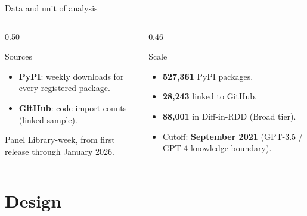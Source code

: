 \documentclass[10pt, aspectratio=169]{beamer}
\begin{document}
\begin{frame}{Data and unit of analysis}
    \begin{columns}[T]
        \begin{column}{0.50\textwidth}
            \begin{block}{Sources}
                \begin{itemize}
                    \item \textbf{PyPI}: weekly downloads for every registered package.
                    \item \textbf{GitHub}: code-import counts (linked sample).
                \end{itemize}
            \end{block}
            \begin{block}{Panel}
                Library-week, from first release through January 2026.
            \end{block}
        \end{column}
        \begin{column}{0.46\textwidth}
            \begin{exampleblock}{Scale}
                \begin{itemize}
                    \item \textbf{527{,}361} PyPI packages.
                    \item \textbf{28{,}243} linked to GitHub.
                    \item \textbf{88{,}001} in Diff-in-RDD (Broad tier).
                    \item Cutoff: \textbf{September 2021} (GPT-3.5 / GPT-4 knowledge boundary).
                \end{itemize}
            \end{exampleblock}
        \end{column}
    \end{columns}
\end{frame}

\section{Design}
\end{document}
